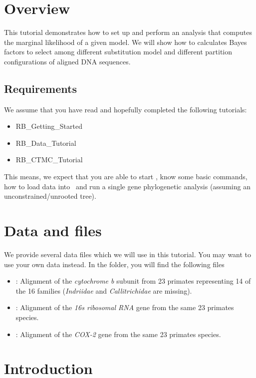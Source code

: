 \section{Overview}


This tutorial demonstrates how to set up and perform an analysis that computes the marginal likelihood of a given model.
We will show how to calculates Bayes factors to select among different substitution model and different partition configurations of aligned DNA sequences. 

\subsection{Requirements}
We assume that you have read and hopefully completed the following tutorials:
\begin{itemize}
\item RB\_Getting\_Started
\item RB\_Data\_Tutorial
\item RB\_CTMC\_Tutorial
\end{itemize}
This means, we expect that you are able to start \RevBayes, know some basic commands, how to load data into \RevBayes~and run a single gene phylogenetic analysis (assuming an unconstrained/unrooted tree).



\section{Data and files}

We provide several data files which we will use in this tutorial.
You may want to use your own data instead.
In the  folder, you will find the following files
\begin{itemize}
\item
{}: Alignment of the \textit{cytochrome b} subunit from 23 primates representing 14 of the 16 families (\textit{Indriidae} and \textit{Callitrichidae} are missing).
\item
{}: Alignment of the \textit{16s ribosomal RNA} gene from the same 23 primates species.
\item
{}: Alignment of the \textit{COX-2} gene from the same 23 primates species.
\end{itemize}



\section{Introduction}

